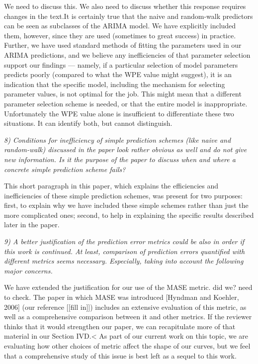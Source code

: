 \documentclass[12pt]{article}
\newcommand{\alert}[1]{{\color{red}#1}}
\begin{document}
{\alert{We need to discuss this.  We also need to discuss whether this
  response requires changes in the text.It is certainly true that the
  naive and random-walk predictors can be seen as subclasses of the
  ARIMA model. We have explicitly included them, however, since they
  are used (sometimes to great success) in practice. Further, we have
  used standard methods of fitting the parameters used in our ARIMA
  predictions, and we believe any inefficiencies of that parameter
  selection support our findings --- namely, if a particular selection
  of model parameters predicts poorly (compared to what the WPE value
  might suggest), it is an indication that the specific model,
  including the mechanism for selecting parameter values, is not
  optimal for the job. This might mean that a different parameter
  selection scheme is needed, or that the entire model is
  inappropriate.  Unfortunately the WPE value alone is insufficient to
  differentiate these two situations.  It can identify both, but
  cannot distinguish.}

\emph{8) Conditions for inefficiency of simple prediction schemes (like naive
and random-walk) discussed in the paper look rather obvious as well and do not
give new information. Is it the purpose of the paper to discuss when and where a
concrete simple prediction scheme fails?}

This short paragraph in this paper, which explains the efficiencies
and inefficiencies of these simple prediction schemes, was present for
two purposes: first, to explain why we have included these simple
schemes rather than just the more complicated ones; second, to help in
explaining the specific results described later in the paper.

\emph{9) A better justification of the prediction error metrics could
  be also in order if this work is continued. At least, comparison of
  prediction errors quantified with different metrics seems
  necessary. Especially, taking into account the following major
  concerns.}

We have extended the justification for our use of the MASE metric.
\alert{did we?  need to check.}  The paper in which MASE was
introduced [Hyndman and Koehler, 2006] (our reference \alert{[[fill
      in]])} includes an extensive evaluation of this metric, as well
as a comprehensive comparison between it and other metrics.  If the
reviewer thinks that it would strengthen our paper, we can
recapitulate more of that material in our Section IVD.<  As part of our
current work on this topic, we are evaluating how other choices of
metric affect the shape of our curves, but we feel that a
comprehensive study of this issue is best left as a sequel to this
work.

}
\end{document}
